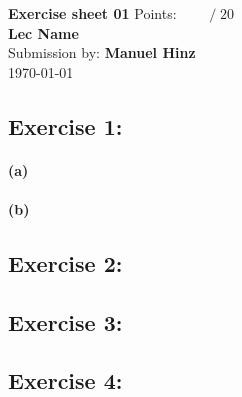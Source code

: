 \documentclass{article}
\def\sheetNumber{01}
\def\names{Manuel Hinz}
\def\sumPoints{20}
\begin{document}
\begin{doublespace} %
    \noindent \textbf{\Large{Exercise sheet \sheetNumber}}
    \hfill  {\large Points: $\boxed{\qquad  /\; \sumPoints}$}\\
    {\Large \textbf{Lec Name}\\
    Submission by: \textbf{\names}\\
    \today}
\end{doublespace}

\subsection*{Exercise 1:}
\paragraph{(a)}

\paragraph{(b)}

\subsection*{Exercise 2:}

\subsection*{Exercise 3:}

\subsection*{Exercise 4:}
\end{document}
